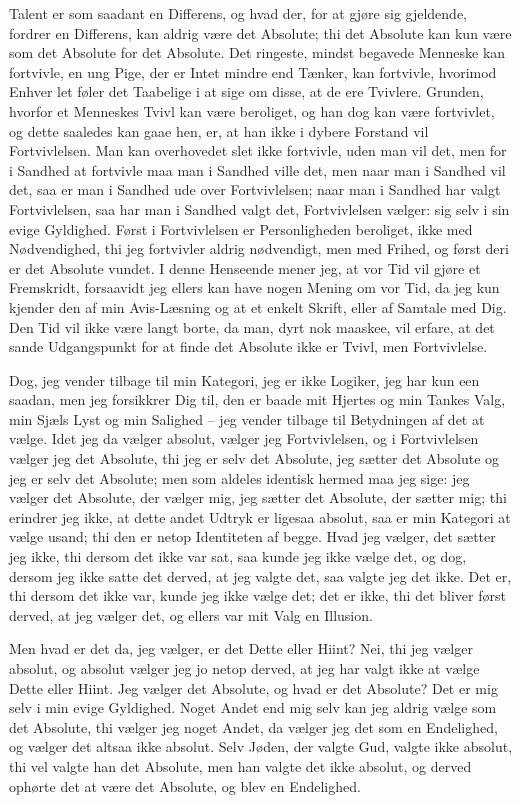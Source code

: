\documentclass[12pt,a4paper]{article}
\begin{document}
Talent er som saadant en Differens, og hvad der, for at gjøre sig gjeldende, fordrer en Differens, kan aldrig være det Absolute; thi det Absolute kan kun være som det Absolute for det Absolute. Det ringeste, mindst begavede Menneske kan fortvivle, en ung Pige, der er Intet mindre end Tænker, kan fortvivle, hvorimod Enhver let føler det Taabelige i at sige om disse, at de ere Tvivlere. Grunden, hvorfor et Menneskes Tvivl kan være beroliget, og han dog kan være fortvivlet, og dette saaledes kan gaae hen, er, at han ikke i dybere Forstand vil Fortvivlelsen. Man kan overhovedet slet ikke fortvivle, uden man vil det, men for i Sandhed at fortvivle maa man i Sandhed ville det, men naar man i Sandhed vil det, saa er man i Sandhed ude over Fortvivlelsen; naar man i Sandhed har valgt Fortvivlelsen, saa har man i Sandhed valgt det, Fortvivlelsen vælger: sig selv i sin evige Gyldighed. Først i Fortvivlelsen er Personligheden beroliget, ikke med Nødvendighed, thi jeg fortvivler aldrig nødvendigt, men med Frihed, og først deri er det Absolute vundet. I denne Henseende mener jeg, at vor Tid vil gjøre et Fremskridt, forsaavidt jeg ellers kan have nogen Mening om vor Tid, da jeg kun kjender den af min Avis-Læsning og at et enkelt Skrift, eller af Samtale med Dig. Den Tid vil ikke være langt borte, da man, dyrt nok maaskee, vil erfare, at det sande Udgangspunkt for at finde det Absolute ikke er Tvivl, men Fortvivlelse.

Dog, jeg vender tilbage til min Kategori, jeg er ikke Logiker, jeg har kun een saadan, men jeg forsikkrer Dig til, den er baade mit Hjertes og min Tankes Valg, min Sjæls Lyst og min Salighed – jeg vender tilbage til Betydningen af det at vælge. Idet jeg da vælger absolut, vælger jeg Fortvivlelsen, og i Fortvivlelsen vælger jeg det Absolute, thi jeg er selv det Absolute, jeg sætter det Absolute og jeg er selv det Absolute; men som aldeles identisk hermed maa jeg sige: jeg vælger det Absolute, der vælger mig, jeg sætter det Absolute, der sætter mig; thi erindrer jeg ikke, at dette andet Udtryk er ligesaa absolut, saa er min Kategori at vælge usand; thi den er netop Identiteten af begge. Hvad jeg vælger, det sætter jeg ikke, thi dersom det ikke var sat, saa kunde jeg ikke vælge det, og dog, dersom jeg ikke satte det derved, at jeg valgte det, saa valgte jeg det ikke. Det er, thi dersom det ikke var, kunde jeg ikke vælge det; det er ikke, thi det bliver først derved, at jeg vælger det, og ellers var mit Valg en Illusion.

Men hvad er det da, jeg vælger, er det Dette eller Hiint? Nei, thi jeg vælger absolut, og absolut vælger jeg jo netop derved, at jeg har valgt ikke at vælge Dette eller Hiint. Jeg vælger det Absolute, og hvad er det Absolute? Det er mig selv i min evige Gyldighed. Noget Andet end mig selv kan jeg aldrig vælge som det Absolute, thi vælger jeg noget Andet, da vælger jeg det som en Endelighed, og vælger det altsaa ikke absolut. Selv Jøden, der valgte Gud, valgte ikke absolut, thi vel valgte han det Absolute, men han valgte det ikke absolut, og derved ophørte det at være det Absolute, og blev en Endelighed.
\end{document}

